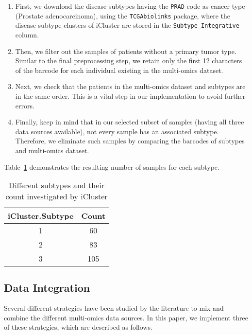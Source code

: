 \begin{enumerate}[\IEEEsetlabelwidth{12)}]
    \item First, we download the disease subtypes having the \verb|PRAD| code as cancer type (Prostate adenocarcinoma), using the \verb|TCGAbiolinks| package, where the disease subtype clusters of iCluster are stored in the \verb|Subtype_Integrative| column.

    \item Then, we filter out the samples of patients without a primary tumor type. Similar to the final preprocessing step, we retain only the first 12 characters of the barcode for each individual existing in the multi-omics dataset.

    \item Next, we check that the patients in the multi-omics dataset and subtypes are in the same order. This is a vital step in our implementation to avoid further errors.

    \item Finally, keep in mind that in our selected subset of samples (having all three data sources available), not every sample has an associated subtype. Therefore, we eliminate such samples by comparing the barcodes of subtypes and multi-omics dataset.
\end{enumerate}

Table~\ref{tab:subtypes} demonstrates the resulting number of samples for each subtype.

\begin{table}[!t]
    \centering
    \caption{Different subtypes and their count investigated by iCluster}
    \begin{tabular}{|c|c|}
    \hline
    \textbf{iCluster.Subtype} & \textbf{Count} \\
    \hline
    1 & 60 \\
    2 & 83 \\
    3 & 105 \\
    \hline
    \end{tabular}
    \label{tab:subtypes}
\end{table}


\subsection{Data Integration}

Several different strategies have been studied by the literature to mix and combine the different multi-omics data sources. In this paper, we implement three of these strategies, which are described as follows.

